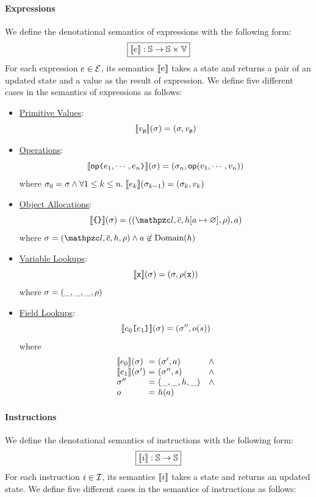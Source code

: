 \paragraph{Expressions} We define the denotational semantics of expressions with
the following form:
\[
  \framebox{$\sem{\expr}: \stset \rightarrow \stset \times \valset$}
\]
For each expression $e \in \mathcal{E}$, its semantics $\llbracket{e}\rrbracket$ takes a
state and returns a pair of an updated state and a value as the result of
expression. We define five different cases in the semantics of expressions as
follows:
\begin{itemize}
  \item \underline{Primitive Values}:
    \[
      \llbracket{v_{\textsf{p}}}\rrbracket(\sigma) =
      (\sigma, v_{\textsf{p}})
    \]

  \item \underline{Operations}:
    \[
      \llbracket{\textsf{op}\texttt{(}e_1, \cdots, e_n \texttt{)}}\rrbracket(\sigma) =
      (\sigma_n, \textsf{op}(v_1, \cdots, v_n))
    \]
    where $\sigma_0 = \sigma \wedge \forall 1 \leq k \leq n. \;
    \llbracket{e_k}\rrbracket(\sigma_{k-1}) = (\sigma_k, v_k)$

  \item \underline{Object Allocations}:
    \[
      \sem{\kwcl \kwcr}(\st) =
      ((\lab, \ctxts, \heap[\addr \mapsto \varnothing], \env), \addr)
    \]
    where $\st = (\lab, \ctxts, \heap, \env) \wedge \addr \not\in
    \text{Domain}(\heap)$

  \item \underline{Variable Lookups}:
    \[
      \llbracket{\texttt{x}}\rrbracket(\sigma) =
      (\sigma, \rho(\texttt{x}))
    \]
    where $\sigma = (\_, \_, \_, \rho)$

  \item \underline{Field Lookups}:
    \[
      \llbracket{e_0 \texttt{[}e_1 \texttt{]}}\rrbracket(\sigma) =
      (\sigma'', o(s))
    \]
    where
    \[
      \begin{array}{l@{~}c@{~}ll}
        \sem{\expr_0}(\st) &=& (\st', \addr) &\wedge\\
        \sem{\expr_1}(\st') &=& (\st'', \str) &\wedge\\
        \st'' &=& (\_, \_, \heap, \_) &\wedge\\
        \obj &=& \heap(\addr)\\
      \end{array}
    \]
\end{itemize}

\paragraph{Instructions} We define the denotational semantics of instructions
with the following form:
\[
  \framebox{$\sem{\inst}: \stset \rightarrow \stset$}
\]
For each instruction $i \in \mathcal{I}$, its semantics $\llbracket{i}\rrbracket$ takes a
state and returns an updated state. We define five different cases in the
semantics of instructions as follows:

